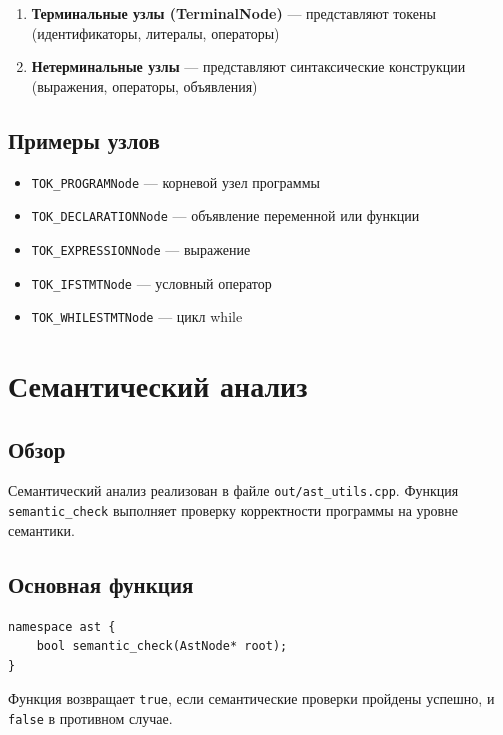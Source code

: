\documentclass[12pt,a4paper]{article}
\begin{document}
\begin{enumerate}
    \item \textbf{Терминальные узлы (TerminalNode)} --- представляют токены (идентификаторы, литералы, операторы)
    \item \textbf{Нетерминальные узлы} --- представляют синтаксические конструкции (выражения, операторы, объявления)
\end{enumerate}

\subsection{Примеры узлов}

\begin{itemize}
    \item \texttt{TOK\_PROGRAMNode} --- корневой узел программы
    \item \texttt{TOK\_DECLARATIONNode} --- объявление переменной или функции
    \item \texttt{TOK\_EXPRESSIONNode} --- выражение
    \item \texttt{TOK\_IFSTMTNode} --- условный оператор
    \item \texttt{TOK\_WHILESTMTNode} --- цикл while
\end{itemize}

\section{Семантический анализ}

\subsection{Обзор}

Семантический анализ реализован в файле \texttt{out/ast\_utils.cpp}. Функция \texttt{semantic\_check} выполняет проверку корректности программы на уровне семантики.

\subsection{Основная функция}

\begin{lstlisting}
namespace ast {
    bool semantic_check(AstNode* root);
}
\end{lstlisting}

Функция возвращает \texttt{true}, если семантические проверки пройдены успешно, и \texttt{false} в противном случае.
\end{document}
